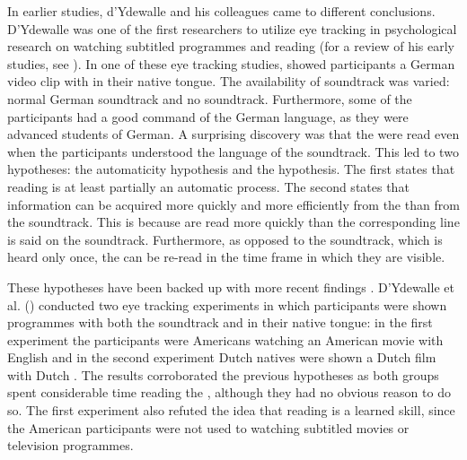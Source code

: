 \documentclass[output=paper]{langsci/langscibook}
\begin{document}
\largerpage
In earlier studies, d'Ydewalle and his colleagues came to different conclusions. D'Ydewalle was one of the first researchers to utilize eye tracking in psychological research on watching subtitled programmes and reading  (for a review of his early studies, see \citealt{dydewalle1992}). In one of these eye tracking studies, \citet{dydewalle1987} showed participants a German video clip with  in their native tongue. The availability of soundtrack was varied: normal German soundtrack and no soundtrack. Furthermore, some of the participants had a good command of the German language, as they were advanced students of German. A surprising discovery was that the  were read even when the participants understood the language of the soundtrack. This led to two hypotheses: the automaticity hypothesis and the  hypothesis. The first states that reading  is at least partially an automatic process. The second states that information can be acquired more quickly and more efficiently from the  than from the soundtrack. This is because  are read more quickly than the corresponding line is said on the soundtrack. Furthermore, as opposed to the soundtrack, which is heard only once, the  can be re-read in the time frame in which they are visible. 


These hypotheses have been backed up with more recent findings \citep{dydewalle1991, Bruycker2007, Perego2010, Perego2015}. D'Ydewalle et al. (\citeyear*{dydewalle1991}) conducted two eye tracking experiments in which participants were shown programmes with both the soundtrack and  in their native tongue: in the first experiment the participants were Americans watching an American movie with English  and in the second experiment Dutch natives were shown a Dutch film with Dutch . The results corroborated the previous hypotheses as both groups spent considerable time reading the , although they had no obvious reason to do so. The first experiment also refuted the idea that reading  is a learned skill, since the American participants were not used to watching subtitled movies or television programmes.
\end{document}
